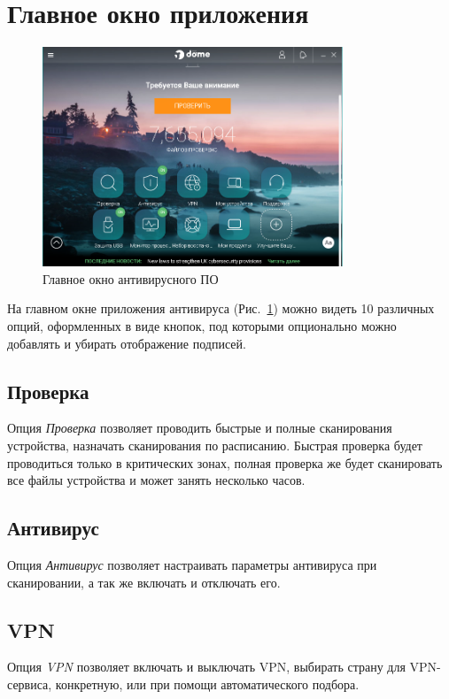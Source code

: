     \section{Главное окно приложения}
        \begin{figure}[h]
            \centering
            \includegraphics[width=0.8\textwidth]{pics/main_window}
            \caption{Главное окно антивирусного ПО}
            \label{main_window}
        \end{figure}
        На главном окне приложения антивируса (Рис.~\ref{main_window}) можно видеть 10 различных опций, оформленных
        в виде кнопок, под которыми опционально можно добавлять и убирать отображение подписей.
        \subsection{Проверка}
        Опция \emph{Проверка} позволяет проводить быстрые и полные сканирования устройства, назначать сканирования по 
        расписанию. Быстрая проверка будет проводиться только в критических зонах, полная проверка же будет сканировать
        все файлы устройства и может занять несколько часов.
        \subsection{Антивирус}
        Опция \emph{Антивирус} позволяет настраивать параметры антивируса при сканировании, а так же включать и отключать его.
        \subsection{VPN}
        Опция \emph{VPN} позволяет включать и выключать VPN, выбирать страну для VPN-сервиса, конкретную, или при помощи
        автоматического подбора.
